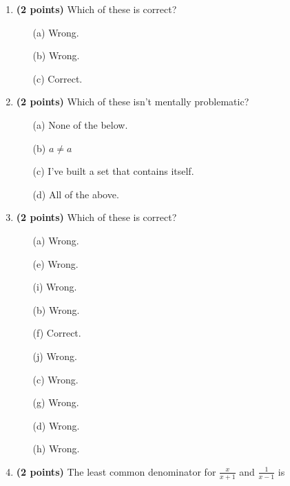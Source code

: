 \documentclass[12pt]{amsart}
\begin{document}
\newpage
\begin{enumerate}
\item {\bf (2 points)} 
 Which of these is correct?

\begin{minipage}[t]{1.0\linewidth}\begin{multicols}{3}\begin{itemize}\item[(a)]  Wrong. \item[(b)]  Wrong. \item[(c)]  Correct. \end{itemize}\end{multicols}\end{minipage} \vfill 
\item {\bf (2 points)} 
 Which of these isn't mentally problematic?

\begin{minipage}[t]{1.0\linewidth}\begin{itemize}\item[(a)]  None of the below.  \item[(b)]  $a \neq a$ \item[(c)]  I've built a set that contains itself. \item[(d)]   All of the above. \end{itemize}\end{minipage} \vfill 
\item {\bf (2 points)} 
 Which of these is correct?

\begin{minipage}[t]{1.0\linewidth}\begin{multicols}{4}\begin{itemize}\item[(a)]  Wrong. \item[(e)]  Wrong. \item[(i)]  Wrong. \item[(b)]  Wrong. \item[(f)]  Correct. \item[(j)]  Wrong. \item[(c)]  Wrong. \item[(g)]  Wrong. \item[] \item[(d)]  Wrong. \item[(h)]  Wrong. \item[] \end{itemize}\end{multicols}\end{minipage} \vfill 
\item {\bf (2 points)} 
 The least common denominator for $\displaystyle \frac{x}{x+1}$ and $\displaystyle \frac{1}{x-1}$ is \vspace{.2cm}


\end{enumerate}
\end{document}

